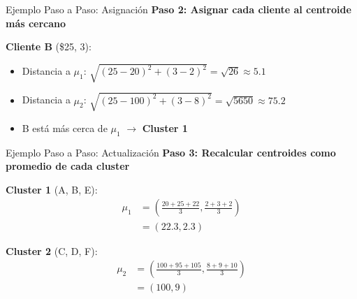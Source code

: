 \documentclass{beamer}
\begin{document}
\begin{frame}{Ejemplo Paso a Paso: Asignación}
    \textbf{Paso 2: Asignar cada cliente al centroide más cercano}

    \vspace{0.5em}

    \textbf{Cliente B} (\$25, 3):
    \begin{itemize}
        \item<1-> Distancia a $\mu_1$: $\sqrt{(25-20)^2 + (3-2)^2} = \sqrt{26} \approx 5.1$
        \item<2-> Distancia a $\mu_2$: $\sqrt{(25-100)^2 + (3-8)^2} = \sqrt{5650} \approx 75.2$
        \item<3-> B está más cerca de $\mu_1$ $\rightarrow$ \textbf{Cluster 1}
    \end{itemize}

    \vspace{0.5em}

\end{frame}

\begin{frame}{Ejemplo Paso a Paso: Actualización}
    \textbf{Paso 3: Recalcular centroides como promedio de cada cluster}

    \vspace{1em}

    \textbf{Cluster 1} (A, B, E):
    \begin{align*}
        \mu_1 &= \left( \frac{20+25+22}{3}, \frac{2+3+2}{3} \right) \\
        &= (22.3, 2.3)
    \end{align*}

    \vspace{0.5em}

    \textbf{Cluster 2} (C, D, F):
    \begin{align*}
        \mu_2 &= \left( \frac{100+95+105}{3}, \frac{8+9+10}{3} \right) \\
        &= (100, 9)
    \end{align*}
\end{frame}
\end{document}
